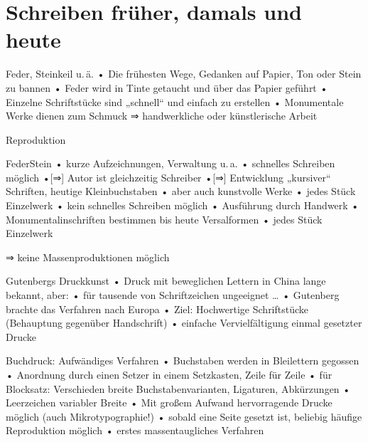 

\usepackage{epic}

\graphicspath{{../Mediales/}}


\section{Schreiben früher, damals und heute}
\begin{frame}{Feder, Steinkeil u.\,ä.}
• Die frühesten Wege, Gedanken auf Papier, Ton oder Stein zu bannen
• Feder wird in Tinte getaucht und über das Papier geführt
• Einzelne Schriftstücke sind „schnell“ und einfach zu erstellen
• Monumentale Werke dienen zum Schmuck ⇒ handwerkliche oder künstlerische Arbeit
\•
\end{frame}

\begin{frame}{Reproduktion}
\begin{twoblock}{Feder}{Stein}
• kurze Aufzeichnungen, Verwaltung u.\,a.
• schnelles Schreiben möglich
•[⇒] Autor ist gleichzeitig Schreiber
•[⇒] Entwicklung „kursiver“ Schriften, heutige Kleinbuchstaben
• aber auch kunstvolle Werke
• jedes Stück Einzelwerk
\•
\nextblock
• kein schnelles Schreiben möglich
• Ausführung durch Handwerk
• Monumentalinschriften bestimmen bis heute Versalformen
• jedes Stück Einzelwerk
\•
\end{twoblock}
\vspace*{1em}
\centerline{⇒ keine Massenproduktionen möglich}
\vspace*{1em}
\end{frame}

\begin{frame}{Gutenbergs Druckkunst}
• Druck mit beweglichen Lettern in China lange bekannt, aber:
• für tausende von Schriftzeichen ungeeignet …
• Gutenberg brachte das Verfahren nach Europa
• Ziel: Hochwertige Schriftstücke (Behauptung gegenüber Handschrift)
• einfache Vervielfältigung einmal gesetzter Drucke
\• 
\end{frame}

\begin{frame}{Buchdruck: Aufwändiges Verfahren}
• Buchstaben werden in Bleilettern gegossen
• Anordnung durch einen Setzer in einem Setzkasten, Zeile für Zeile
• für Blocksatz: Verschieden breite Buchstabenvarianten, Ligaturen, Abkürzungen
• Leerzeichen variabler Breite
• Mit großem Aufwand hervorragende Drucke möglich (auch Mikrotypographie!)
• sobald eine Seite gesetzt ist, beliebig häufige Reproduktion möglich
• erstes massentaugliches Verfahren
\•
\end{frame}

